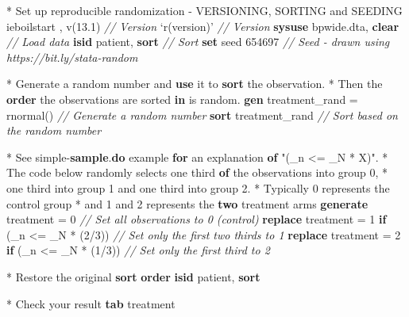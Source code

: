 \documentclass[
]{book}
\newenvironment{Shaded}{\begin{snugshade}}{\end{snugshade}}
\newcommand{\CommentTok}[1]{\textcolor[rgb]{0.56,0.35,0.01}{\textit{#1}}}
\newcommand{\DataTypeTok}[1]{\textcolor[rgb]{0.13,0.29,0.53}{#1}}
\newcommand{\DecValTok}[1]{\textcolor[rgb]{0.00,0.00,0.81}{#1}}
\newcommand{\FunctionTok}[1]{\textcolor[rgb]{0.00,0.00,0.00}{#1}}
\newcommand{\KeywordTok}[1]{\textcolor[rgb]{0.13,0.29,0.53}{\textbf{#1}}}
\newcommand{\NormalTok}[1]{#1}
\newcommand{\OtherTok}[1]{\textcolor[rgb]{0.56,0.35,0.01}{#1}}
\newcommand{\StringTok}[1]{\textcolor[rgb]{0.31,0.60,0.02}{#1}}
\begin{document}
\begin{Shaded}
\begin{Highlighting}[numbers=left,,]
\NormalTok{* Set up reproducible randomization - VERSIONING, SORTING and SEEDING}
\NormalTok{    ieboilstart , v(13.1)    }\CommentTok{// Version}
    \OtherTok{`r(version)'}             \CommentTok{// Version}
    \KeywordTok{sysuse}\NormalTok{ bpwide.dta, }\KeywordTok{clear} \CommentTok{// Load data}
    \KeywordTok{isid}\NormalTok{ patient, }\KeywordTok{sort}       \CommentTok{// Sort}
    \KeywordTok{set} \DecValTok{seed}\NormalTok{ 654697          }\CommentTok{// Seed - drawn using https://bit.ly/stata-random}

\NormalTok{* Generate a random number and }\KeywordTok{use}\NormalTok{ it to }\KeywordTok{sort}\NormalTok{ the observation.}
\NormalTok{* Then the }\KeywordTok{order}\NormalTok{ the observations are sorted }\KeywordTok{in}\NormalTok{ is random.}
    \KeywordTok{gen}\NormalTok{ treatment_rand = rnormal() }\CommentTok{// Generate a random number}
    \KeywordTok{sort}\NormalTok{ treatment_rand            }\CommentTok{// Sort based on the random number}

\NormalTok{* See simple-}\KeywordTok{sample}\NormalTok{.}\KeywordTok{do}\NormalTok{ example }\KeywordTok{for}\NormalTok{ an explanation }\KeywordTok{of} \StringTok{"(_n <= _N * X)"}\NormalTok{.}
\NormalTok{* The code below randomly selects one third }\KeywordTok{of}\NormalTok{ the observations into }\FunctionTok{group}\NormalTok{ 0,}
\NormalTok{* one third into }\FunctionTok{group}\NormalTok{ 1 and one third into }\FunctionTok{group}\NormalTok{ 2.}
\NormalTok{* Typically 0 represents the control }\FunctionTok{group}
\NormalTok{* and 1 and 2 represents the }\KeywordTok{two}\NormalTok{ treatment arms}
    \KeywordTok{generate}\NormalTok{ treatment = 0                       }\CommentTok{// Set all observations to 0 (control)}
    \KeywordTok{replace}\NormalTok{  treatment = 1 }\KeywordTok{if}\NormalTok{ (}\DataTypeTok{_n}\NormalTok{ <= _N * (2/3)) }\CommentTok{// Set only the first two thirds to 1}
    \KeywordTok{replace}\NormalTok{  treatment = 2 }\KeywordTok{if}\NormalTok{ (}\DataTypeTok{_n}\NormalTok{ <= _N * (1/3)) }\CommentTok{// Set only the first third to 2}

\NormalTok{* Restore the original }\KeywordTok{sort} \KeywordTok{order}
    \KeywordTok{isid}\NormalTok{ patient, }\KeywordTok{sort}

\NormalTok{* Check your result}
    \KeywordTok{tab}\NormalTok{ treatment}
\end{Highlighting}
\end{Shaded}
\end{document}
